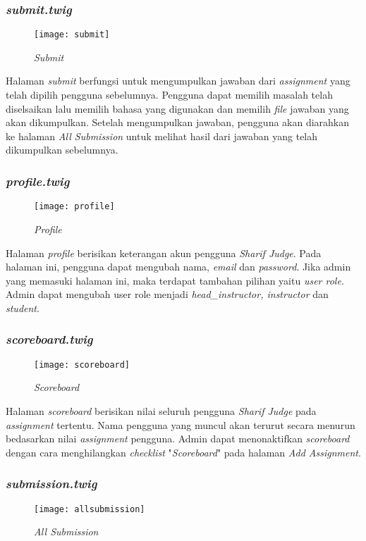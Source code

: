 \subsubsection{\textit{submit.twig}}
\begin{figure}[H]
	\centering  
	\texttt{[image: submit]}  
	\caption[\textit{Submit}]{\textit{Submit}} 
	\label{fig:submit} 
\end{figure} 
Halaman \textit{submit} berfungsi untuk mengumpulkan jawaban dari \textit{assignment} yang telah dipilih pengguna sebelumnya. Pengguna dapat memilih masalah telah diselsaikan lalu memilih bahasa yang digunakan dan memilih \textit{file} jawaban yang akan dikumpulkan. Setelah mengumpulkan jawaban, pengguna akan diarahkan ke halaman \textit{All Submission} untuk melihat hasil dari jawaban yang telah dikumpulkan sebelumnya.

\subsubsection{\textit{profile.twig}}
\begin{figure}[H]
	\centering  
	\texttt{[image: profile]}  
	\caption[\textit{Profile}]{\textit{Profile}} 
	\label{fig:profile} 
\end{figure} 
Halaman \textit{profile} berisikan keterangan akun pengguna \textit{Sharif Judge}. Pada halaman ini, pengguna dapat mengubah nama, \textit{email} dan \textit{password}. Jika admin yang memasuki halaman ini, maka terdapat tambahan pilihan yaitu \textit{user role}. Admin dapat mengubah user role menjadi \textit{head\_instructor, instructor} dan \textit{student}.

\subsubsection{\textit{scoreboard.twig}}
\begin{figure}[H]
	\centering  
	\texttt{[image: scoreboard]}  
	\caption[\textit{Scoreboard}]{\textit{Scoreboard}} 
	\label{fig:scoreboard} 
\end{figure} 
Halaman \textit{scoreboard} berisikan nilai seluruh pengguna \textit{Sharif Judge} pada \textit{assignment} tertentu. Nama pengguna yang muncul akan terurut secara menurun bedasarkan nilai \textit{assignment} pengguna. Admin dapat menonaktifkan \textit{scoreboard} dengan cara menghilangkan \textit{checklist} "\textit{Scoreboard}" pada halaman \textit{Add Assignment}.

\subsubsection{\textit{submission.twig}}
\begin{figure}[H]
	\centering  
	\texttt{[image: allsubmission]}  
	\caption[\textit{All Submission}]{\textit{All Submission}} 
	\label{fig:allsubmission} 
\end{figure} 

